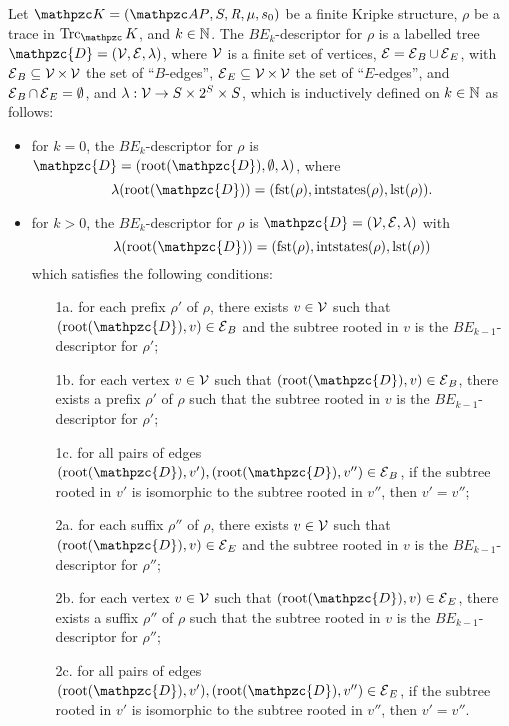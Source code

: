 \begin{definition}\label{def:BEdescr}
Let $\Ku=\KuDef$ be a finite Kripke structure, $\rho$ be a trace in $\Trk_\Ku$,
and $k \in \mathbb{N}$.
The $BE_k$-descriptor for $\rho$ is a labelled tree $\mathpzc{D}=(\DV,\DE,\lambda)$, where $\operatorname{\mathcal{V}}$ is 
a finite set of vertices, $\operatorname{\mathcal{E}}=\operatorname{\mathcal{E}}_B\cup \operatorname{\mathcal{E}}_E$, with $\operatorname{\mathcal{E}}_B\subseteq \operatorname{\mathcal{V}}\times \operatorname{\mathcal{V}}$ the set of ``$B$-edges'',
$\operatorname{\mathcal{E}}_E\subseteq \operatorname{\mathcal{V}}\times \operatorname{\mathcal{V}}$ the set of ``$E$-edges'', and $\operatorname{\mathcal{E}}_B\cap \operatorname{\mathcal{E}}_E=\emptyset$, and $\lambda:\operatorname{\mathcal{V}}\to S\times 2^S\times S$, which is inductively defined on $k\in\mathbb{N}$ as follows:
    \begin{itemize}
        \item for $k=0$, the $BE_k$-descriptor for $\rho$ is $\mathpzc{D}=(\Root(\mathpzc{D}),\emptyset,\lambda)$, where 
        \begin{equation*}
            \lambda(\Root(\mathpzc{D}))=(\fst(\rho),\intstates(\rho),\lst(\rho)).
        \end{equation*}        
        
        \item for $k>0$, the $BE_k$-descriptor for $\rho$ is $\mathpzc{D}=(\DV,\DE,\lambda)$ with 
        \begin{equation*}
            \lambda(\Root(\mathpzc{D}))=(\fst(\rho),\intstates(\rho),\lst(\rho))
        \end{equation*}                
         which satisfies the following conditions:
            \begin{enumerate}
                \item[1a.] for each prefix $\rho'$ of $\rho$, there exists $v\in \operatorname{\mathcal{V}}$ such that $(\Root(\mathpzc{D}),v)\in \DE_B$ and the subtree rooted in $v$ is the $BE_{k-1}$-descriptor for $\rho'$;
                \item[1b.] for each vertex $v\in \operatorname{\mathcal{V}}$ such that $(\Root(\mathpzc{D}),v)\in \DE_B$, there exists a prefix $\rho'$ of $\rho$ such that the subtree rooted in $v$ is the $BE_{k-1}$-descriptor for $\rho'$;
                \item[1c.] for all pairs of edges $(\Root(\mathpzc{D}),v'), (\Root(\mathpzc{D}),v'') \in \DE_B$, if the subtree rooted in $v'$ is isomorphic to the  subtree rooted in $v''$, then $v'=v''$;
                \item[2a.] for each suffix $\rho''$ of $\rho$, there exists $v\in \operatorname{\mathcal{V}}$ such that $(\Root(\mathpzc{D}),v)\in \DE_E$ and the subtree rooted in $v$ is the $BE_{k-1}$-descriptor for $\rho''$;
                \item[2b.] for each vertex $v\in \operatorname{\mathcal{V}}$ such that $(\Root(\mathpzc{D}),v)\in \DE_E$, there exists a suffix $\rho''$ of $\rho$ such that the subtree rooted in $v$ is the $BE_{k-1}$-descriptor for $\rho''$;
                \item[2c.] for all pairs of edges $(\Root(\mathpzc{D}),v'), (\Root(\mathpzc{D}),v'')\in \DE_E$, if the subtree rooted in $v'$ is isomorphic to the subtree rooted in $v''$, then $v'=v''$.
            \end{enumerate}
    \end{itemize}
\end{definition}
